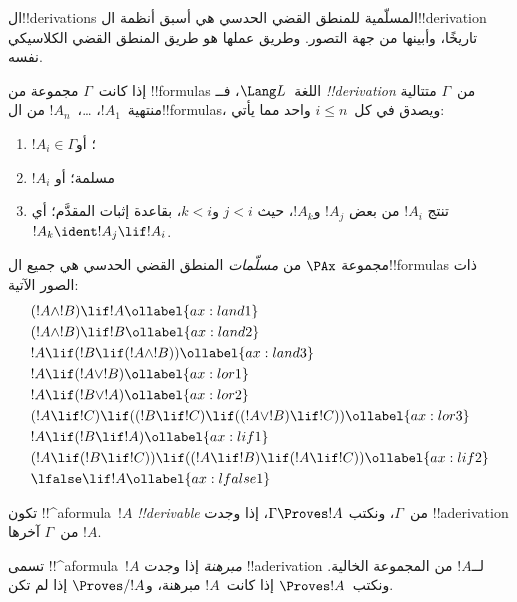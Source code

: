 \documentclass[../../../include/open-logic-section]{subfiles}
\begin{document}


ال!!{derivation}s المسلّمية للمنطق القضي الحدسي هي أسبق أنظمة
ال!!{derivation} تاريخًا، وأبينها من جهة التصور. وطريق عملها هو طريق
المنطق القضي الكلاسيكي نفسه.

\begin{defn}[!!^{derivability}]
إذا كانت~$\Gamma$ مجموعة من !!{formula}s اللغة~$\Lang L$، فــ
\emph{!!{derivation}} من~$\Gamma$ متتالية منتهية~$!A_1$،
\dots،~$!A_n$ من ال!!{formula}s، ويصدق في كل~$i \le n$ واحد مما يأتي:
\begin{enumerate}
\item $!A_i \in \Gamma$؛ أو
\item $!A_i$ مسلمة؛ أو
\item تنتج $!A_i$ من بعض $!A_j$ و$!A_k$، حيث $j < i$ و$k < i$،
  بقاعدة إثبات المقدَّم؛ أي $!A_k \ident !A_j \lif !A_i$.
\end{enumerate}
\end{defn}

\begin{defn}
مجموعة $\PAx$ من \emph{مسلّمات} المنطق القضي الحدسي هي جميع
ال!!{formula}s ذات الصور الآتية:
\begin{align}
  & (!A \land !B) \lif !A \ollabel{ax:land1}\\
  & (!A \land !B) \lif !B \ollabel{ax:land2}\\
  & !A \lif (!B \lif (!A \land !B)) \ollabel{ax:land3}\\
  & !A \lif (!A \lor !B) \ollabel{ax:lor1}\\
  & !A \lif (!B \lor !A) \ollabel{ax:lor2}\\
  & (!A \lif !C) \lif ((!B \lif !C) \lif ((!A \lor !B) \lif !C)) \ollabel{ax:lor3}\\
  & !A \lif (!B \lif !A) \ollabel{ax:lif1}\\
  & (!A \lif (!B \lif !C)) \lif ((!A \lif !B) \lif (!A \lif !C)) \ollabel{ax:lif2}\\
  & \lfalse \lif !A \ollabel{ax:lfalse1}
\end{align}
\end{defn}

\begin{defn}[!!^{derivability}]
تكون !!^a{formula}~$!A$ \emph{!!{derivable}} من~$\Gamma$، ونكتب
$\Gamma \Proves !A$، إذا وجدت !!a{derivation} من~$\Gamma$ آخرها
$!A$.
\end{defn}

\begin{defn}[المبرهنات]
تسمى !!^a{formula}~$!A$ \emph{مبرهنة} إذا وجدت !!a{derivation}
لــ$!A$ من المجموعة الخالية. ونكتب~$\Proves !A$ إذا كانت~$!A$
مبرهنة، و$\Proves/ !A$ إذا لم تكن.
\end{defn}
\end{document}
